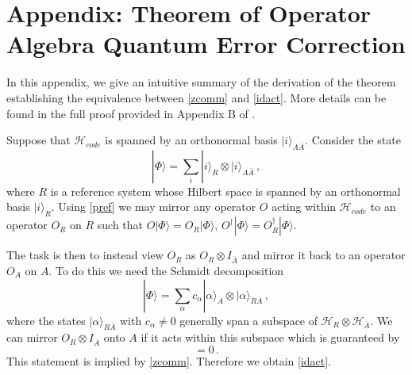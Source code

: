 \documentclass[aps,nofootinbib,longbibliography,superscriptaddress,12pt]{revtex4-1}
\newcommand{\be}{\begin{equation}}
\newcommand{\ee}{\end{equation}}
\newcommand{\Ab}{\overline{A}}
\newcommand{\HAb}{\mathcal{H}_{\overline{A}}}
\newcommand{\Hc}{\mathcal{H}_{code}}
\def\a{\alpha}
\def\P{\Phi}
\def\r{\rho}
\def\la{\label}
\def\er{\eqref}
\def\>{\rangle}
\begin{document}
\section{Appendix: Theorem of Operator Algebra Quantum Error Correction}

In this appendix, we give an intuitive summary of the derivation of the theorem establishing the equivalence between \er{zcomm} and \er{idact}.  More details can be found in the full proof provided in Appendix B of \cite{Almheiri:2014lwa}.

Suppose that $\Hc$ is spanned by an orthonormal basis $|i\>_{A\Ab}$.  Consider the state
\be\la{pref}
|\P\> = \sum_i |i\>_R \otimes |i\>_{A\Ab} \,,
\ee
where $R$ is a reference system whose Hilbert space is spanned by an orthonormal basis $|i\>_R$.  Using \er{pref} we may mirror any operator $O$ acting within $\Hc$ to an operator $O_R$ on $R$ such that $O|\P\> = O_R|\P\>$, $O^\dag |\P\> = O_R^\dag |\P\>$.

The task is then to instead view $O_R$ as $O_R \otimes I_{\Ab}$ and mirror it back to an operator $O_A$ on $A$.  To do this we need the Schmidt decomposition
\be
|\P\> = \sum_\a c_\a |\a\>_A \otimes |\a\>_{R\Ab} \,,
\ee
where the states $|\a\>_{R\Ab}$ with $c_\a \neq 0$ generally span a subspace of $\mathcal{H}_R \otimes \HAb$.  We can mirror $O_R \otimes I_{\Ab}$ onto $A$ if it acts within this subspace which is guaranteed by
\be
[O_R \otimes I_{\Ab}, \r_{R\Ab}(\P)] = 0 \,.
\ee
This statement is implied by \er{zcomm}.  Therefore we obtain \er{idact}.


\end{document}

